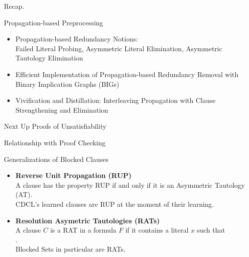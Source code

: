 \documentclass[t]{sdqbeamer}
\begin{document}
\begin{frame}{Recap.}
\begin{block}{Propagation-based Preprocessing}
    \begin{itemize}\setlength{\itemsep}{1em}
        \item Propagation-based Redundancy Notions:\\[1ex]
        Failed Literal Probing, Asymmetric Literal Elimination, Asymmetric Tautology Elimination
        \item Efficient Implementation of Propagation-based Redundancy Removal with Binary Implication Graphs (BIGs)
        \item Vivification and Distillation: Interleaving Propagation with Clause Strengthening and Elimination
    \end{itemize}
\end{block}
\begin{block}{Next Up}
    Proofs of Unsatisfiability
\end{block}
\end{frame}

\begin{frame}{Relationship with Proof Checking}
\begin{block}{Generalizations of Blocked Clauses}~\\
\begin{itemize}\setlength{\itemsep}{1em}
    \item \textbf{Reverse Unit Propagation (RUP)}\\[1pt]
    A clause has the property RUP if and only if it is an Asymmetric Tautology (AT).\\[1ex]
    CDCL's learned clauses are RUP at the moment of their learning.
    \item \textbf{Resolution Asymetric Tautologies (RATs)}\\[1pt]
    A clause $C$ is a RAT in a formula $F$ if it contains a literal $x$ such that\\
    .\\[1ex]
    Blocked Sets in particular are RATs.
\end{itemize}
~\\
\end{block}
\end{frame}
\end{document}
